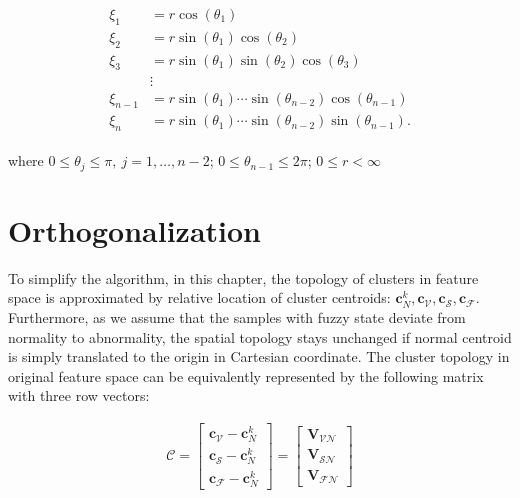 \begin{align}
\begin{aligned}
\label{eq:sph2cart}
\xi_1 &= r \cos(\theta_1) \\
\xi_2 &= r \sin(\theta_1) \cos(\theta_2) \\
\xi_3 &= r \sin(\theta_1) \sin(\theta_2) \cos(\theta_3) \\
    &\vdots\\
\xi_{n-1} &= r \sin(\theta_1) \cdots \sin(\theta_{n-2}) \cos(\theta_{n-1}) \\
\xi_n &= r \sin(\theta_1) \cdots \sin(\theta_{n-2}) \sin(\theta_{n-1}) 
 .
\end{aligned}
\end{align}


where $0\leq \theta_j\leq\pi,~j=1,\dots ,n-2$; $0\leq \theta_{n-1}\leq 2 \pi$; $0\leq r<\infty$
 
 
\section{Orthogonalization}

To simplify the algorithm, in this chapter, the topology of clusters in feature space is approximated by relative location of cluster centroids: $\mathbf{c}_N^k, \mathbf{c}_{\mathcal{V}}, \mathbf{c}_{\mathcal{S}}, \mathbf{c}_{\mathcal{F}}$. Furthermore, as we assume that the samples with fuzzy state deviate from normality to abnormality, the spatial topology stays unchanged if normal centroid is simply translated to the origin in Cartesian coordinate. The cluster topology in original feature space can be equivalently represented by the following matrix with three row vectors:

\begin{align}
\mathcal{C} = 
\begin{bmatrix}
\mathbf{c}_{\mathcal{V}} - \mathbf{c}_N^k \\
\mathbf{c}_{\mathcal{S}} - \mathbf{c}_N^k \\
\mathbf{c}_{\mathcal{F}} - \mathbf{c}_N^k
\end{bmatrix} = 
\begin{bmatrix}
\mathbf{V}_{\mathcal{VN}} \\
\mathbf{V}_{\mathcal{SN}} \\
\mathbf{V}_{\mathcal{FN}}
\end{bmatrix}
\end{align}

